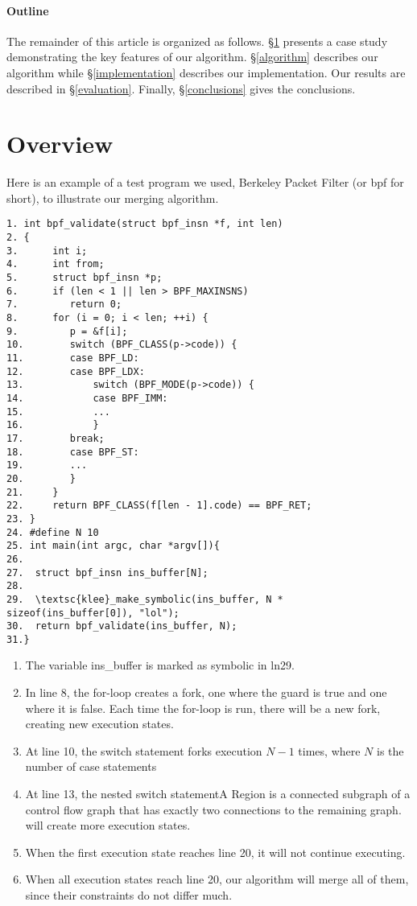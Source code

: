 \documentclass[12pt,a4paper]{article}
\begin{document}
\paragraph{Outline}

The remainder of this article is organized as follows. \S\ref{overview} presents a case study demonstrating the key features of our algorithm. \S\ref{algorithm} describes our algorithm while \S\ref{implementation} describes our implementation. Our results are described in \S\ref{evaluation}. Finally, \S\ref{conclusions} gives the conclusions.

\section{Overview}\label{overview}
Here is an example of a test program we used, Berkeley Packet Filter (or bpf for short), to illustrate our merging algorithm.

\begin{verbatim}
1. int bpf_validate(struct bpf_insn *f, int len)
2. {
3.      int i;
4.      int from;
5.      struct bpf_insn *p;
6.      if (len < 1 || len > BPF_MAXINSNS)
7.         return 0;
8.      for (i = 0; i < len; ++i) {
9.         p = &f[i];
10.        switch (BPF_CLASS(p->code)) {
11.        case BPF_LD:
12.        case BPF_LDX:
13.            switch (BPF_MODE(p->code)) {
14.            case BPF_IMM:
15.            ...
16.            }
17.        break;
18.        case BPF_ST:
19.        ...
20.        }
21.     }
22.     return BPF_CLASS(f[len - 1].code) == BPF_RET;
23. }
24. #define N 10 
25. int main(int argc, char *argv[]){  
26.
27.  struct bpf_insn ins_buffer[N];
28.
29.  \textsc{klee}_make_symbolic(ins_buffer, N * sizeof(ins_buffer[0]), "lol");
30.  return bpf_validate(ins_buffer, N);
31.}
\end{verbatim}

\begin{enumerate}
\item The variable ins\_buffer is marked as symbolic in ln29. 
\item In line 8, the for-loop creates a fork, one where the guard is true and one where it is false. Each time the for-loop is run, there will be a new fork, creating new execution states. 
\item At line 10, the switch statement forks execution $N-1$ times, where $N$ is the number of case statements
\item At line 13, the nested switch statementA Region is a connected subgraph of a control flow graph that has exactly two connections to the remaining graph. will create more execution states. 
\item When the first execution state reaches line 20, it will not continue executing.
\item When all execution states reach line 20, our algorithm will merge all of them, since their constraints do not differ much.
\end{enumerate}
\end{document}
